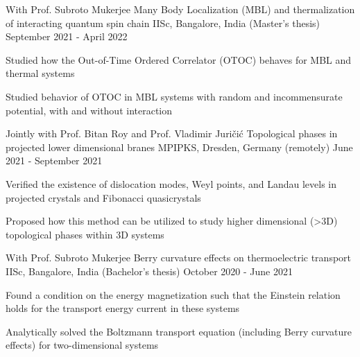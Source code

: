 \begin{cventries}
\cventry
{With Prof. Subroto Mukerjee} %
{Many Body Localization (MBL) and thermalization of interacting quantum spin chain} %
{IISc, Bangalore, India \space \space\space\space\space\space\space\space\space\space\space\space\space(Master's thesis)} %
{September 2021 - April 2022} %
	{
		\begin{cvitems} %
			\item{Studied how the Out-of-Time Ordered Correlator (OTOC) behaves for MBL and thermal systems}
			\item{Studied behavior of OTOC in MBL systems with random and incommensurate potential, with and without interaction}
		\end{cvitems}
	}


\cventry
{Jointly with Prof. Bitan Roy and Prof. Vladimir Juri\v{c}i\'c} %
{Topological phases in projected lower dimensional branes} %
{MPIPKS, Dresden, Germany (remotely)} %
{June 2021 - September 2021} %
{
	\begin{cvitems} %
		\item {Verified the existence of dislocation modes, Weyl points, and Landau levels in projected crystals and Fibonacci quasicrystals}
		\item {Proposed how this method can be utilized to study higher dimensional (>3D) topological phases within 3D systems}
	\end{cvitems}
}

\cventry
{With Prof. Subroto Mukerjee} %
{Berry curvature effects on thermoelectric transport} %
{IISc, Bangalore, India \space \space\space\space\space\space\space\space\space\space\space(Bachelor's thesis)} %
{October 2020 - June 2021} %
{
	\begin{cvitems} %
		\item {Found a condition on the energy magnetization such that the Einstein relation holds for the transport energy current in these systems}
		\item {Analytically solved the Boltzmann transport equation (including Berry curvature effects) for two-dimensional systems}
	\end{cvitems}
}
	

\end{cventries}
